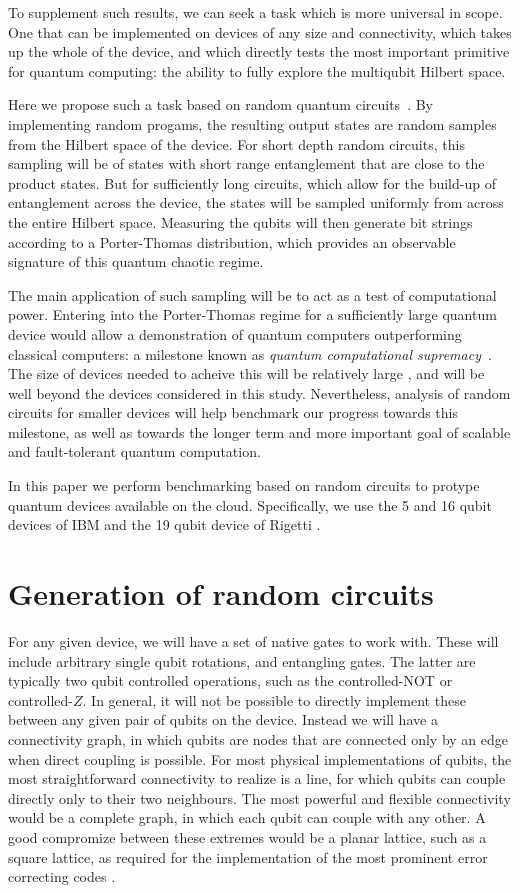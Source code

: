 \documentclass[aps,prl,twocolumn,showpacs,preprintnumbers]{revtex4-1}
\begin{document}
To supplement such results, we can seek a task which is more universal in scope. One that can be implemented on devices of any size and connectivity, which takes up the whole of the device, and which directly tests the most important primitive for quantum computing: the ability to fully explore the multiqubit Hilbert space.

Here we propose such a task based on random quantum circuits~\cite{boixo:18}. By implementing random progams, the resulting output states are random samples from the Hilbert space of the device. For short depth random circuits, this sampling will be of states with short range entanglement that are close to the product states. But for sufficiently long circuits, which allow for the build-up of entanglement across the device, the states will be sampled uniformly from across the entire Hilbert space. Measuring the qubits will then generate bit strings according to a Porter-Thomas distribution, which provides an observable signature of this quantum chaotic regime.

The main application of such sampling will be to act as a test of computational power. Entering into the Porter-Thomas regime for a sufficiently large quantum device would allow a demonstration of quantum computers outperforming classical computers: a milestone known as \textit{quantum computational supremacy}~\cite{preskill:12}. The size of devices needed to acheive this will be relatively large \cite{chen:18}, and will be well beyond the devices considered in this study. Nevertheless, analysis of random circuits for smaller devices will help benchmark our progress towards this milestone, as well as towards the longer term and more important goal of scalable and fault-tolerant quantum computation.

In this paper we perform benchmarking based on random circuits to protype quantum devices available on the cloud. Specifically, we use the 5 and 16 qubit devices of IBM \cite{ibm:backends} and the 19 qubit device of Rigetti \cite{rigetti:acorn}.


\section{Generation of random circuits}

For any given device, we will have a set of native gates to work with. These will include arbitrary single qubit rotations, and entangling gates. The latter are typically two qubit controlled operations, such as the controlled-NOT or controlled-$Z$. In general, it will not be possible to directly implement these between any given pair of qubits on the device. Instead we will have a connectivity graph, in which qubits are nodes that are connected only by an edge when direct coupling is possible. For most physical implementations of qubits, the most straightforward connectivity to realize is a line, for which qubits can couple directly only to their two neighbours. The most powerful and flexible connectivity would be a complete graph, in which each qubit can couple with any other. A good compromize between these extremes would be a planar lattice, such as a square lattice, as required for the implementation of the most prominent error correcting codes \cite{dennis,lidar:13}.
\end{document}
